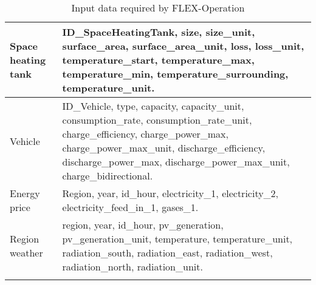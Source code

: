 \begin{center}
\begin{longtable}{ | p{} | p{} | }
            \hline 
            Space heating tank & ID\_SpaceHeatingTank, size, size\_unit, surface\_area, surface\_area\_unit, loss, loss\_unit, temperature\_start, temperature\_max, temperature\_min, temperature\_surrounding, temperature\_unit. \\
            \hline 
            Vehicle & ID\_Vehicle, type, capacity, capacity\_unit, consumption\_rate, consumption\_rate\_unit, charge\_efficiency, charge\_power\_max, charge\_power\_max\_unit, discharge\_efficiency, discharge\_power\_max, discharge\_power\_max\_unit, charge\_bidirectional. \\
            \hline 
            Energy price & Region, year, id\_hour, electricity\_1, electricity\_2, electricity\_feed\_in\_1, gases\_1. \\
            \hline 
            Region weather & region, year, id\_hour, pv\_generation, pv\_generation\_unit, temperature, temperature\_unit, radiation\_south, radiation\_east, radiation\_west, radiation\_north, radiation\_unit. \\
            \hline 
        
        \caption{Input data required by FLEX-Operation}
        \label{tab:dataset}
    \end{longtable}
\end{center}
